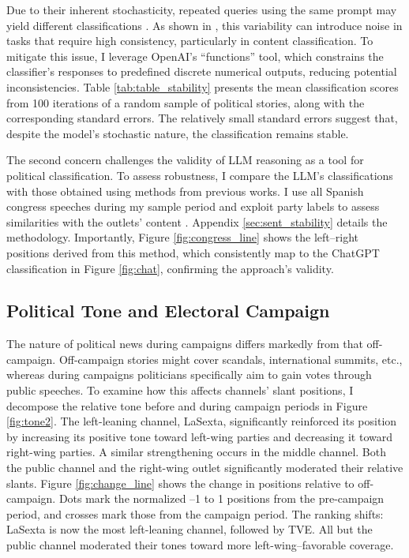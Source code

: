 \documentclass[12pt]{article}
\begin{document}
Due to their inherent stochasticity, repeated queries using the same prompt may yield different classifications \citep{llmstability2024}. As shown in \citep{llmclassification2024}, this variability can introduce noise in tasks that require high consistency, particularly in content classification. To mitigate this issue, I leverage OpenAI’s “functions” tool, which constrains the classifier’s responses to predefined discrete numerical outputs, reducing potential inconsistencies. Table \ref{tab:table_stability} presents the mean classification scores from 100 iterations of a random sample of political stories, along with the corresponding standard errors. The relatively small standard errors suggest that, despite the model’s stochastic nature, the classification remains stable.

The second concern challenges the validity of LLM reasoning as a tool for political classification. To assess robustness, I compare the LLM’s classifications with those obtained using methods from previous works. I use all Spanish congress speeches during my sample period and exploit party labels to assess similarities with the outlets’ content \citep{gentzkow2010media,laver2003extracting}. Appendix \ref{sec:sent_stability} details the methodology. Importantly, Figure \ref{fig:congress_line} shows the left–right positions derived from this method, which consistently map to the ChatGPT classification in Figure \ref{fig:chat}, confirming the approach’s validity.





\subsection*{Political Tone and Electoral Campaign}

The nature of political news during campaigns differs markedly from that off-campaign. Off-campaign stories might cover scandals, international summits, etc., whereas during campaigns politicians specifically aim to gain votes through public speeches. To examine how this affects channels’ slant positions, I decompose the relative tone before and during campaign periods in Figure \ref{fig:tone2}. The left-leaning channel, LaSexta, significantly reinforced its position by increasing its positive tone toward left-wing parties and decreasing it toward right-wing parties. A similar strengthening occurs in the middle channel. Both the public channel and the right-wing outlet significantly moderated their relative slants. Figure \ref{fig:change_line} shows the change in positions relative to off-campaign. Dots mark the normalized –1 to 1 positions from the pre-campaign period, and crosses mark those from the campaign period. The ranking shifts: LaSexta is now the most left-leaning channel, followed by TVE. All but the public channel moderated their tones toward more left-wing–favorable coverage.
\end{document}
